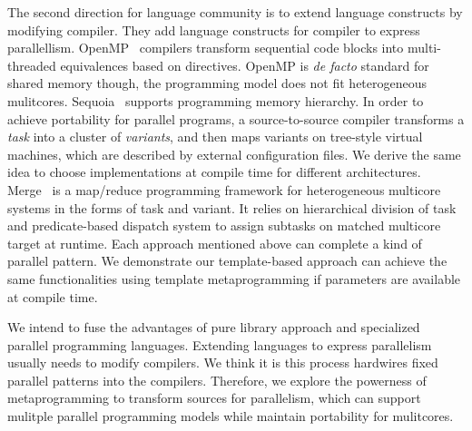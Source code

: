 

The second direction for language community is to extend language constructs by
modifying compiler. They add language constructs for compiler to
express parallellism. OpenMP~\cite{openmp} compilers transform sequential code blocks into
multi-threaded equivalences based on
directives. OpenMP is \textit{de facto} standard for shared memory
though, the programming model does not fit heterogeneous mulitcores. Sequoia~\cite{sequoia, sequoia-compiler} supports
programming memory hierarchy. In order to achieve portability for
parallel programs, a source-to-source compiler transforms a \textit{task} into a cluster of
\emph{variants}, and then maps variants on tree-style virtual 
machines, which are described by external configuration files.
We derive the same idea to choose implementations at compile time for
different architectures. Merge~\cite{merge} is a map/reduce programming
framework for heterogeneous multicore 
systems in the forms of task and variant. It relies on hierarchical division of task and predicate-based
dispatch system to assign subtasks on matched multicore target at
runtime. Each approach mentioned above can complete a kind of parallel pattern.
We demonstrate our template-based approach can achieve the same
functionalities using template metaprogramming if parameters are
available at compile time. 

We intend to fuse the advantages of pure library approach and
specialized parallel programming languages. Extending 
languages to express parallelism usually needs to modify compilers. We
think it is this process hardwires fixed parallel patterns into the
compilers. Therefore, we explore the powerness of metaprogramming to
transform sources for parallelism, which
can support mulitple parallel programming models while maintain
portability for mulitcores.

